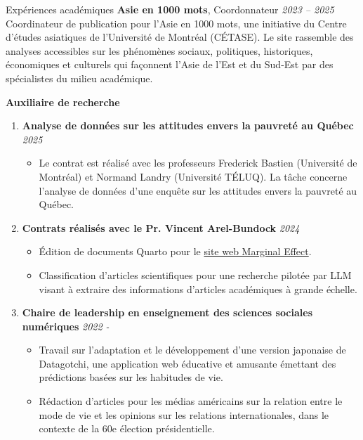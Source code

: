 \documentclass{resume} %
\begin{document}
\begin{rSection}{Expériences académiques}
	{\bf Asie en 1000 mots}{, Coordonnateur} \hfill {\em 2023 -- 2025}\\
	Coordinateur de publication pour l'Asie en 1000 mots, une initiative du Centre d'études asiatiques de l'Université de Montréal (CÉTASE). Le site rassemble des analyses accessibles sur les phénomènes sociaux, politiques, historiques, économiques et culturels qui façonnent l'Asie de l'Est et du Sud-Est par des spécialistes du milieu académique.

	{\bf Auxiliaire de recherche}
	\begin{enumerate}
		\item \textbf{Analyse de données sur les attitudes envers la pauvreté au Québec} \hfill {\em 2025}
		      \begin{itemize}
			      \item[-] Le contrat est réalisé avec les professeurs Frederick Bastien (Université de Montréal) et Normand Landry (Université TÉLUQ). La tâche concerne l'analyse de données d'une enquête sur les attitudes envers la pauvreté au Québec.
		      \end{itemize}
		\item \textbf{Contrats réalisés avec le Pr. Vincent Arel-Bundock} \hfill {\em 2024}
		      \begin{itemize}
			      \item[-] Édition de documents Quarto pour le \href{https://marginaleffects.com}{site web Marginal Effect}.
			      \item[-] Classification d'articles scientifiques pour une recherche pilotée par LLM visant à extraire des informations d'articles académiques à grande échelle.
		      \end{itemize}
		\item \textbf{Chaire de leadership en enseignement des sciences sociales numériques} \hfill {\em 2022 -}
		      \begin{itemize}
			      \item[-] {Travail sur l'adaptation et le développement d'une version japonaise de Datagotchi, une application web éducative et amusante émettant des prédictions basées sur les habitudes de vie.}
			      \item[-] Rédaction d'articles pour les médias américains sur la relation entre le mode de vie et les opinions sur les relations internationales, dans le contexte de la 60e élection présidentielle.

\end{itemize}
\end{enumerate}
\end{rSection}
\end{document}
